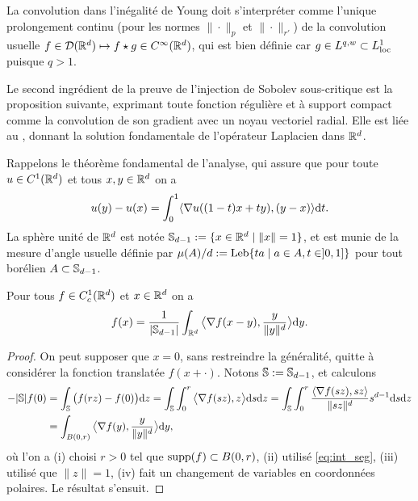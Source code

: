 La convolution dans l'inégalité de Young doit s'interpréter comme l'unique prolongement continu (pour les normes $\|\cdot\|_p$ et $\|\cdot\|_{r'}$) de la convolution usuelle $f\in \mathcal{D}(\mathbb{R}^d) \mapsto f\star g \in C^\infty(\mathbb{R}^d)$, qui est bien définie car $g \in L^{q,w} \subset L^1_{\mathrm{loc}}$ puisque $q>1$.


Le second ingrédient de la preuve de l'injection de Sobolev sous-critique est la proposition suivante, exprimant toute fonction régulière et à support compact comme la convolution de son gradient avec un noyau vectoriel radial. Elle est liée au , donnant la solution fondamentale de l'opérateur Laplacien dans $\mathbb{R}^d$.

Rappelons le théorème fondamental de l'analyse, qui assure que pour toute $u \in C^1(\mathbb{R}^d)$ et tous $x,y \in \mathbb{R}^d$ on a 
\begin{equation}
\label{eq:int_seg}
	u(y)-u(x) = \int_0^1 \langle\nabla u((1-t) x+t y),(y-x)\rangle \mathrm{d} t	.
\end{equation}
La sphère unité de $\mathbb{R}^d$ est notée $\mathbb{S}_{d-1} := \{x \in \mathbb{R}^d \mid \|x\|=1\}$, et est munie de la mesure d'angle usuelle définie par $\mu(A) / d := \operatorname{Leb}\{ta \mid a\in A, t \in ]0,1]\}$ pour tout borélien $A \subset \mathbb{S}_{d-1}$.

\begin{proposition}
\label{prop:convolPow} 
%
Pour tous $f \in C^1_c(\mathbb{R}^d)$ et $x \in \mathbb{R}^d$ on a 
\begin{equation*}
	f(x) = \frac 1 {|\mathbb{S}_{d-1}|} \int_{\mathbb{R}^d} \big\langle\nabla f(x-y), \frac y {\|y\|^d}\big\rangle \mathrm{d} y.
\end{equation*}
\end{proposition}

\begin{proof}
On peut supposer que $x=0$, sans restreindre la généralité, quitte à considérer la fonction translatée $f(x+\cdot)$. Notons $\mathbb{S} := \mathbb{S}_{d-1}$, et calculons
\begin{align*}
	-|\mathbb{S}| f(0) 
	&= \int_{\mathbb{S}} \big(f(r z) - f(0)\big) \mathrm{d} z
	= \int_{\mathbb{S}} \int_0^r \big\langle\nabla f(s z), z\big\rangle \mathrm{d} s \mathrm{d} z 
	= \int_{\mathbb{S}} \int_0^r \frac{\langle\nabla f(s z), sz\rangle}{\|s z\|^d} s^{d-1}\mathrm{d} s \mathrm{d} z \\
	&= \int_{B(0,r)} \big\langle\nabla f(y),\frac{y}{\|y\|^d}\big\rangle \mathrm{d} y,
\end{align*}
où l'on a (i) choisi $r>0$ tel que $\operatorname{supp}(f) \subset B(0,r)$, (ii) utilisé \eqref{eq:int_seg}, (iii) utilisé que $\|z\|=1$, (iv) fait un changement de variables en coordonnées polaires. Le résultat s'ensuit.
\end{proof}


